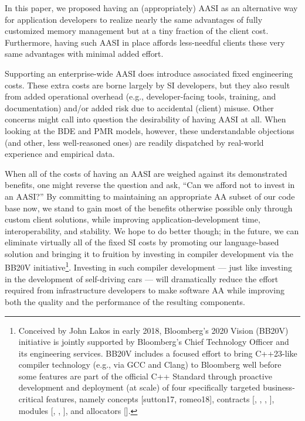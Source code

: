 In this paper, we proposed having an (appropriately) AASI as an alternative way for
application developers to realize nearly the same advantages of fully customized
memory management but at a tiny fraction of the client cost. Furthermore, having
such AASI in place affords less-needful clients these very same advantages with
minimal added effort.

Supporting an enterprise-wide AASI does introduce associated fixed engineering
costs. These extra costs are borne largely by SI developers, but they also result from
added operational overhead (e.g., developer-facing tools, training, and
documentation) and/or added risk due to accidental (client) misuse. Other concerns
might call into question the desirability of having AASI at all. When looking at the
BDE and PMR models, however, these understandable objections (and other, less
well-reasoned ones) are readily dispatched by real-world experience and empirical
data.

When all of the costs of having an AASI are weighed against its demonstrated
benefits, one might reverse the question and ask, “Can we afford not to invest in an
AASI?” By committing to maintaining an appropriate AA subset of our code base
now, we stand to gain most of the benefits otherwise possible only through custom
client solutions, while improving application-development time, interoperability, and
stability. We hope to do better though; in the future, we can eliminate virtually all of
the fixed SI costs by promoting our language-based solution and bringing it to
fruition by investing in compiler development via the BB20V initiative\footnote{Conceived by John Lakos in early 2018, Bloomberg’s 2020 Vision (BB20V) initiative \cite{lakos18} is
jointly supported by Bloomberg’s Chief Technology Officer and its engineering services. BB20V
includes a focused effort to bring C++23-like compiler technology (e.g., via GCC and Clang) to
Bloomberg well before some features are part of the official C++ Standard through proactive
development and deployment (at scale) of four specifically targeted business-critical features, namely
concepts [sutton17, romeo18], contracts [\cite{dosreis16}, \cite{berne18a}, \cite{berne18b}, \cite{berne19}], modules
[\cite{lakos17a}, \cite{burgers19}, \cite{dosreis15}], and allocators [\cite{halpern20c}].}. Investing in
such compiler development — just like investing in the development of self-driving
cars — will dramatically reduce the effort required from infrastructure developers to
make software AA while improving both the quality and the performance of the
resulting components.


